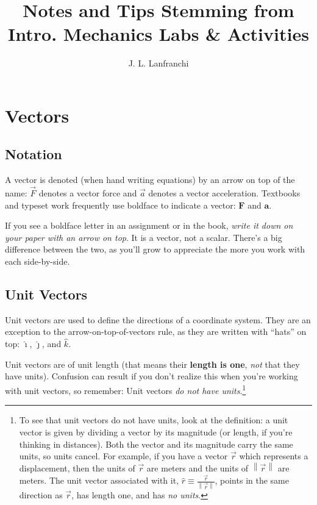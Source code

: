 \documentclass[10pt,letterpaper,twoside]{article}
\author{J. L. Lanfranchi}
\title{Notes and Tips Stemming from Intro. Mechanics Labs \& Activities}
\begin{document}
 
\vspace{-40pt}
\maketitle
\vspace{-50pt}
\section{Vectors}
\subsection{Notation}
A vector is denoted (when hand writing equations) by an arrow on top of the name: $\vec F$ denotes a vector force and $\vec a$ denotes a vector acceleration.
Textbooks and typeset work frequently use boldface to indicate a vector: $\mathbf F$ and $\mathbf a$.

If you see a boldface letter in an assignment or in the book, \textit{write it down on your paper with an arrow on top}.
It is a vector, not a scalar.
There's a big difference between the two, as you'll grow to appreciate the more you work with each side-by-side.

\subsection{Unit Vectors}
Unit vectors are used to define the directions of a coordinate system.
They are an exception to the arrow-on-top-of-vectors rule, as they are written with ``hats'' on top: $\hat\imath$, $\hat\jmath$, and $\hat k$.

Unit vectors are of unit length (that means their \textbf{length is one}, \textit{not} that they have units).
Confusion can result if you don't realize this when you're working with unit vectors, so remember: Unit vectors \textit{do not have units}.\footnote{
To see that unit vectors do not have units, look at the definition: a unit vector is given by dividing a vector by its magnitude (or length, if you're thinking in distances).
Both the vector and its magnitude carry the same units, so units cancel.
For example, if you have a vector $\vec r$ which represents a displacement, then the units of $\vec r$ are meters and the units of $\left\lVert \vec r\right\rVert $ are meters.
The unit vector associated with it, $\hat r\equiv \frac{\vec r}{\left\lVert \vec r\right\rVert }$, points in the same direction as $\vec r$, has length one, and has \textit{no units}.

}
\end{document}
